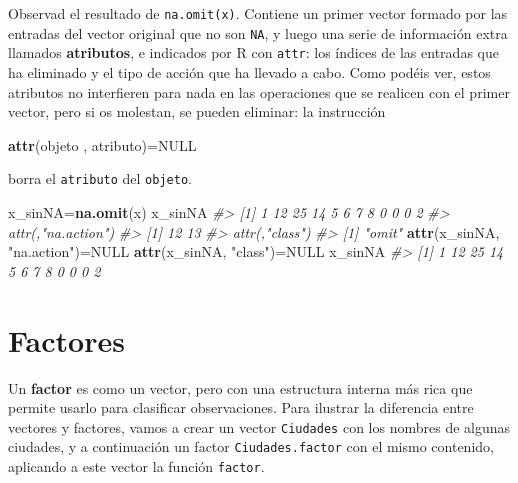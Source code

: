 \documentclass[
]{book}
\newenvironment{Shaded}{\begin{snugshade}}{\end{snugshade}}
\newcommand{\CommentTok}[1]{\textcolor[rgb]{0.56,0.35,0.01}{\textit{#1}}}
\newcommand{\KeywordTok}[1]{\textcolor[rgb]{0.13,0.29,0.53}{\textbf{#1}}}
\newcommand{\NormalTok}[1]{#1}
\newcommand{\OtherTok}[1]{\textcolor[rgb]{0.56,0.35,0.01}{#1}}
\newcommand{\StringTok}[1]{\textcolor[rgb]{0.31,0.60,0.02}{#1}}
\theoremstyle{definition}
\theoremstyle{definition}
\theoremstyle{definition}
\theoremstyle{remark}
\begin{document}
Observad el resultado de \texttt{na.omit(x)}. Contiene un primer vector formado por las entradas del vector original que no son \texttt{NA}, y luego una serie de información extra llamados \textbf{atributos}, e indicados por R con \texttt{attr}: los índices de las entradas que ha eliminado y el tipo de acción que ha llevado a cabo.
Como podéis ver, estos atributos no interfieren para nada en las operaciones que se realicen con el primer vector, pero si os molestan, se pueden eliminar: la instrucción

\begin{Shaded}
\begin{Highlighting}[]
\KeywordTok{attr}\NormalTok{(objeto , atributo)=}\OtherTok{NULL}
\end{Highlighting}
\end{Shaded}

borra el \texttt{atributo} del \texttt{objeto}.

\begin{Shaded}
\begin{Highlighting}[]
\NormalTok{x\_sinNA=}\KeywordTok{na.omit}\NormalTok{(x)}
\NormalTok{x\_sinNA}
\CommentTok{\#\textgreater{}  [1]  1 12 25 14  5  6  7  8  0  0  0  2}
\CommentTok{\#\textgreater{} attr(,"na.action")}
\CommentTok{\#\textgreater{} [1] 12 13}
\CommentTok{\#\textgreater{} attr(,"class")}
\CommentTok{\#\textgreater{} [1] "omit"}
\KeywordTok{attr}\NormalTok{(x\_sinNA, }\StringTok{"na.action"}\NormalTok{)=}\OtherTok{NULL}
\KeywordTok{attr}\NormalTok{(x\_sinNA, }\StringTok{"class"}\NormalTok{)=}\OtherTok{NULL}
\NormalTok{x\_sinNA}
\CommentTok{\#\textgreater{}  [1]  1 12 25 14  5  6  7  8  0  0  0  2}
\end{Highlighting}
\end{Shaded}

\hypertarget{subsec:factor}{%
\section{Factores}\label{subsec:factor}}

Un \textbf{factor} es como un vector, pero con una estructura interna más rica que permite usarlo para clasificar observaciones. Para ilustrar la diferencia entre vectores y factores, vamos a crear un vector \texttt{Ciudades} con los nombres de algunas ciudades, y a continuación un factor \texttt{Ciudades.factor} con el mismo contenido, aplicando a este vector la función \texttt{factor}.
\end{document}
